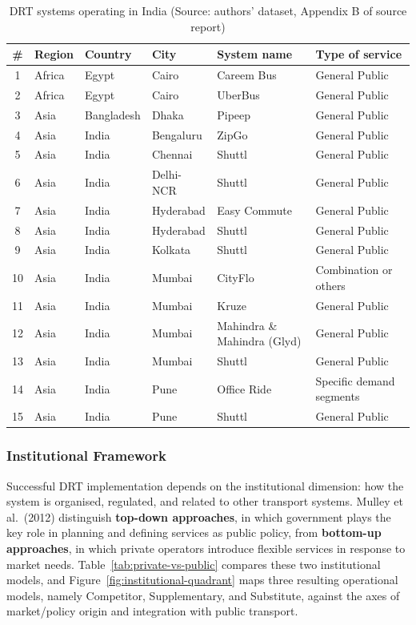 \documentclass[12pt]{article}
\begin{document}
\begin{table}[H]
\centering
\small
\caption{DRT systems operating in India (Source: authors' dataset, Appendix B of source report)}
\label{tab:drt-india}
\begin{tabular}{@{}cp{1.5cm}p{1.8cm}p{1.9cm}p{3.7cm}p{2.8cm}@{}}
\toprule
\textbf{\#} & \textbf{Region} & \textbf{Country} & \textbf{City} & \textbf{System name} & \textbf{Type of service} \\
\midrule
1  & Africa & Egypt & Cairo & Careem Bus & General Public \\
2  & Africa & Egypt & Cairo & UberBus & General Public \\
3  & Asia & Bangladesh & Dhaka & Pipeep & General Public \\
4  & Asia & India & Bengaluru & ZipGo & General Public \\
5  & Asia & India & Chennai & Shuttl & General Public \\
6  & Asia & India & Delhi-NCR & Shuttl & General Public \\
7  & Asia & India & Hyderabad & Easy Commute & General Public \\
8  & Asia & India & Hyderabad & Shuttl & General Public \\
9  & Asia & India & Kolkata & Shuttl & General Public \\
10 & Asia & India & Mumbai & CityFlo & Combination or others \\
11 & Asia & India & Mumbai & Kruze & General Public \\
12 & Asia & India & Mumbai & Mahindra \& Mahindra (Glyd) & General Public \\
13 & Asia & India & Mumbai & Shuttl & General Public \\
14 & Asia & India & Pune & Office Ride & Specific demand segments \\
15 & Asia & India & Pune & Shuttl & General Public \\
\bottomrule
\end{tabular}
\end{table}

\subsubsection{Institutional Framework}

Successful DRT implementation depends on the institutional dimension: how the
system is organised, regulated, and related to other transport systems. Mulley et
al.\ (2012) distinguish \textbf{top-down approaches}, in which government plays the
key role in planning and defining services as public policy, from
\textbf{bottom-up approaches}, in which private operators introduce flexible
services in response to market needs. Table~\ref{tab:private-vs-public} compares
these two institutional models, and Figure~\ref{fig:institutional-quadrant} maps
three resulting operational models, namely Competitor, Supplementary, and Substitute,
against the axes of market/policy origin and integration with public transport.
\end{document}
